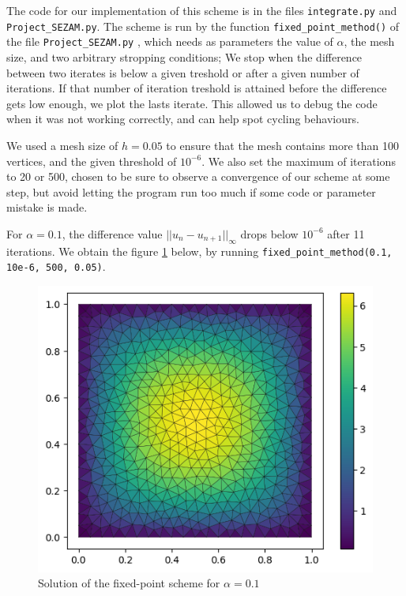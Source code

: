\documentclass[11pt, a4paper, twoside]{article}
\begin{document}
The code for our implementation of this scheme is in the files \verb+integrate.py+ and \verb+Project_SEZAM.py+. The scheme is run by the function \verb+fixed_point_method()+ of the file  \verb+Project_SEZAM.py+ , which needs as parameters the value of $\alpha$, the mesh size, and two arbitrary stropping conditions; We stop when the difference between two iterates is below a given treshold or after a given number of iterations. If that number of iteration treshold is attained before the difference gets low enough, we plot the lasts iterate. This allowed us to debug the code when it was not working correctly, and can help spot cycling behaviours.

We used a mesh size of $h=0.05$ to ensure that the mesh contains more than 100 vertices, and the given threshold of $10^{-6}$. We also set the maximum of iterations to 20 or 500, chosen to be sure to observe a convergence of our scheme at some step, but avoid letting the program run too much if some code or parameter mistake is made.

For $\alpha=0.1$, the difference value $||u_n -u_{n+1}||_\infty$ drops below $10^{-6}$ after 11 iterations. We obtain the figure \ref{q2fig1} below, by running \verb+fixed_point_method(0.1, 10e-6, 500, 0.05)+.
\begin{figure}[H]
\centering
\includegraphics[scale = 0.7]{../Figures/fixed_sol_alpha0.1.png}
\caption{Solution of the fixed-point scheme for $\alpha=0.1$}
\label{q2fig1}
\end{figure}
\end{document}
